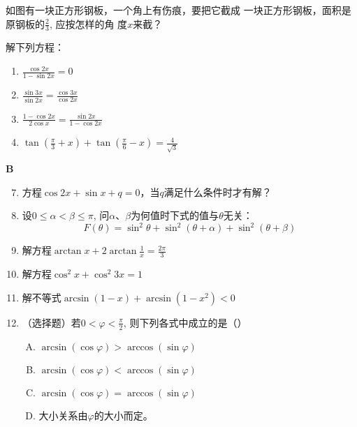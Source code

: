 \begin{enumerate}
\noindent
\begin{minipage}{.6\textwidth}
\item 如图有一块正方形钢板，一个角上有伤痕，要把它截成
一块正方形钢板，面积是原钢板的$\frac{2}{3}$, 应按怎样的角
度$x$来截？

\item 解下列方程：
\begin{enumerate}[(1)]
    \item $\frac{\cos2x}{1-\sin2x}=0$
    \item $\frac{\sin3x}{\sin2x}=\frac{\cos3x}{\cos2x}$
    \item $\frac{1-\cos2x}{2\cos x}=\frac{\sin2x}{1-\cos2x}$
    \item $\tan\left(\frac{\pi}{3}+x\right)+\tan\left(\frac{\pi}{6}-x\right)=\frac{4}{\sqrt{3}}$
\end{enumerate}
\end{minipage}
\hfill
\begin{minipage}{.5\textwidth}
\centering
{}
\end{minipage}

\end{enumerate}

\begin{center}
    \bfseries B
\end{center}

\begin{enumerate}\setcounter{enumi}{6}
\item 方程$\cos2x+\sin x+q=0$，当$q$满足什么条件时才有解？
\item 设$0\leqslant\alpha<\beta\leqslant\pi$, 问$\alpha$、$\beta$为何值时下式的值与$\theta$无关：
$$F(\theta)=\sin^2\theta+\sin^2(\theta+\alpha)+\sin^2(\theta+\beta) $$
\item 解方程$\arctan x+2\arctan\frac1x=\frac{2\pi}3$
\item 解方程$\cos^2x+\cos^2 3x=1$
\item 解不等式$\arcsin(1-x)+\arcsin(1-x^{2})<0$ 
\item （选择题）若$0<\varphi<\frac\pi2$, 则下列各式中成立的是\hfill（\qquad）
\begin{enumerate}[(A)]
    \item $\arcsin(\cos\varphi)>\arccos(\sin\varphi)$
    \item $\arcsin(\cos\varphi)<\arccos(\sin\varphi)$
    \item $\arcsin(\cos\varphi)=\arccos(\sin\varphi)$
    \item 大小关系由$\varphi$的大小而定。
\end{enumerate}
\end{enumerate}
